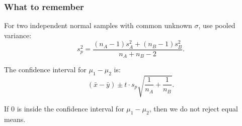 \documentclass[10pt]{article}
\begin{document}
\subsubsection*{What to remember}

For two independent normal samples with common
unknown \(\sigma\), use pooled variance:
\[
s_p^2
=
\frac{
(n_A-1)s_A^2+(n_B-1)s_B^2
}{
n_A+n_B-2
}.
\]

The confidence interval for \(\mu_1-\mu_2\) is:
\[
(\bar{x}-\bar{y})
\pm
t\cdot s_p
\sqrt{
\frac{1}{n_A}
+
\frac{1}{n_B}
}.
\]

If \(0\) is inside the confidence interval for
\(\mu_1-\mu_2\), then we do not reject equal means.
\end{document}
